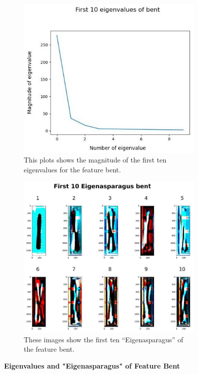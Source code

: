 \begin{figure}[H]
	\centering
	\begin{subfigure}{0.7\textwidth}
		\includegraphics[width=0.9\linewidth]{Figures/chapter04/pca_bent_graph.png} 
		\caption{This plots shows the magnitude of the first ten eigenvalues for the feature bent.}
	\end{subfigure}
	\vspace{20pt}
	
	\begin{subfigure}{0.9\textwidth}
		\includegraphics[width=0.9\linewidth]{Figures/chapter04/pca_bent.png}
		\caption{These images show the first ten “Eigenasparagus” of the feature bent.}
	\end{subfigure}
    \caption[First ten Eigenvalues and "Eigenasparagus" of Feature Bent]{\textbf{Eigenvalues and "Eigenasparagus" of Feature Bent}}
    \label{fig:PCAbent}
\end{figure}

